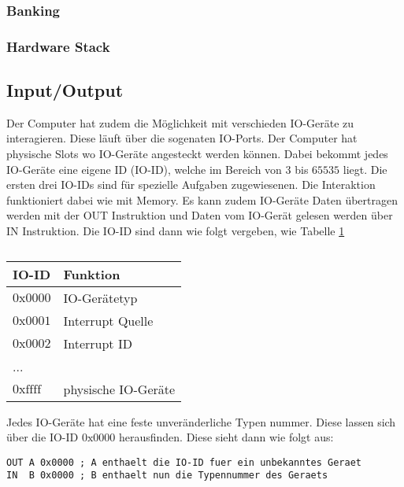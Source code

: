 \documentclass{scrartcl}
\begin{document}
\subsubsection{\label{section:banking}Banking}

\subsubsection{\label{section:stack}Hardware Stack}

\subsection{\label{section:io}Input/Output}

Der Computer hat zudem die Möglichkeit mit verschieden IO-Geräte zu interagieren. Diese läuft über die sogenaten IO-Ports. Der Computer hat physische Slots wo IO-Geräte angesteckt werden können. Dabei bekommt jedes IO-Geräte eine eigene ID (IO-ID), welche im Bereich von $3$ bis $65535$ liegt. Die ersten drei IO-IDs sind für spezielle Aufgaben zugewiesenen. Die Interaktion funktioniert dabei wie mit Memory. Es kann zudem IO-Geräte Daten übertragen werden mit der OUT Instruktion und Daten vom IO-Gerät gelesen werden über IN Instruktion. Die IO-ID sind dann wie folgt vergeben, wie Tabelle \ref{table:IOIDs}

\begin{center}
	\begin{table}[h]
		\caption{\label{table:IOIDs}}
		\begin{tabular}{l | l}
			IO-ID & Funktion \\
			\hline
			$0\text{x}0000$ & IO-Gerätetyp \\
			$0\text{x}0001$ & Interrupt Quelle \\
			$0\text{x}0002$ & Interrupt ID \\
			... & \\
			$0\text{xffff}$ & physische IO-Geräte
 		\end{tabular}
	\end{table}
\end{center}

Jedes IO-Geräte hat eine feste unveränderliche Typen nummer. Diese lassen sich über die IO-ID $0\text{x}0000$ herausfinden. Diese sieht dann wie folgt aus: 

\begin{lstlisting}[style=asm]
OUT A 0x0000 ; A enthaelt die IO-ID fuer ein unbekanntes Geraet 
IN  B 0x0000 ; B enthaelt nun die Typennummer des Geraets
\end{lstlisting}
\end{document}
